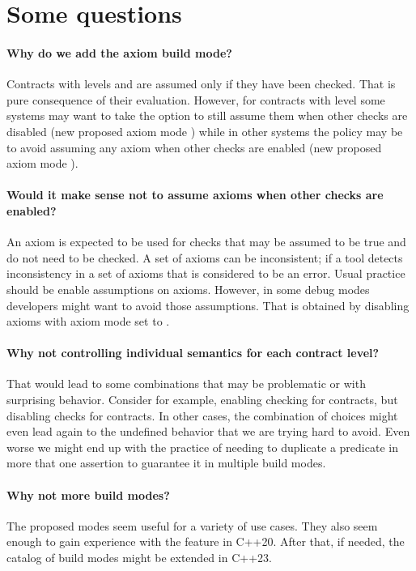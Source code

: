 \section{Some questions}
\label{sec:questions}

\paragraph{Why do we add the axiom build mode?}
Contracts with levels  and  are assumed only
if they have been checked. That is pure consequence of their evaluation.
However, for contracts with level 
some systems may want to take the option to still assume them when other checks
are disabled (new proposed axiom mode ) while in other
systems the policy may be to avoid assuming any axiom when other checks are
enabled (new proposed axiom mode ).

\paragraph{Would it make sense not to assume axioms when other checks are
enabled?}
An axiom is expected to be used for checks that may be assumed to be true 
and do not need to be checked. 
A set of axioms can be inconsistent; if a tool detects inconsistency in a
set of axioms that is considered to be an error.
Usual practice should be enable assumptions on axioms.
However, in some debug modes developers might want to avoid those assumptions.
That is obtained by disabling axioms with axiom mode set to .

\paragraph{Why not controlling individual semantics for each contract level?}
That would lead to some combinations that may be problematic or with surprising
behavior. Consider for example,  
enabling checking for  contracts, but disabling checks for 
contracts. In other cases, the combination of choices might even lead again to
the undefined behavior that we are trying hard to avoid. Even worse we might
end up with the practice of needing to duplicate a predicate in more that one
assertion to guarantee it in multiple build modes.

\paragraph{Why not more build modes?}
The proposed modes seem useful for a variety of use cases. 
They also seem enough to gain
experience with the feature in C++20. After that, if needed, the catalog of
build modes might be extended in C++23.

